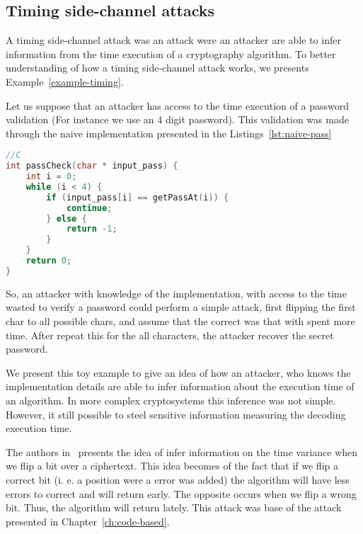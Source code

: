 \subsection{Timing side-channel attacks}\label{sub:timing-attack}
A timing side-channel attack was an attack were an attacker are able to infer information from the time execution of a cryptography algorithm. To better understanding of how a timing side-channel attack works, we presents Example~\ref{example-timing}. 

\begin{example}\label{example-timing}
Let us suppose that an attacker has access to the time execution of a password validation (For instance we use an 4 digit password). This validation was made through the naive implementation presented in the Listings~\ref{lst:naive-pass}

\begin{lstlisting}[caption={Naive implementation of password check },label={lst:naive-pass},language=C]
//C
int passCheck(char * input_pass) {
    int i = 0;
    while (i < 4) {
        if (input_pass[i] == getPassAt(i)) {
            continue;
        } else {
            return -1;
        }
    }
    return 0;
}
\end{lstlisting}
So, an attacker with knowledge of the implementation, with access to the time wasted to verify a password could perform a simple attack, first  flipping the first char to all possible chars, and assume that the correct was that with spent more time. After repeat this for the all characters, the attacker recover the secret password.
\end{example}

We present this toy example to give an idea of how an attacker, who knows the implementation details are able to infer information about the execution time of an algorithm. In more complex cryptosystems this inference was not simple. However, it still possible to steel sensitive information measuring the decoding execution time.

The authors in~\cite{shoufan2009timing} presents the idea of infer information on the time variance when we flip a bit over a ciphertext. This idea becomes of the fact that if we flip a correct bit (i. e. a position were a error was added) the algorithm will have less errors to correct and will return early. The opposite occurs when we flip a wrong bit. Thus, the algorithm will return lately. This attack was base of the attack presented in Chapter~\ref{ch:code-based}.


